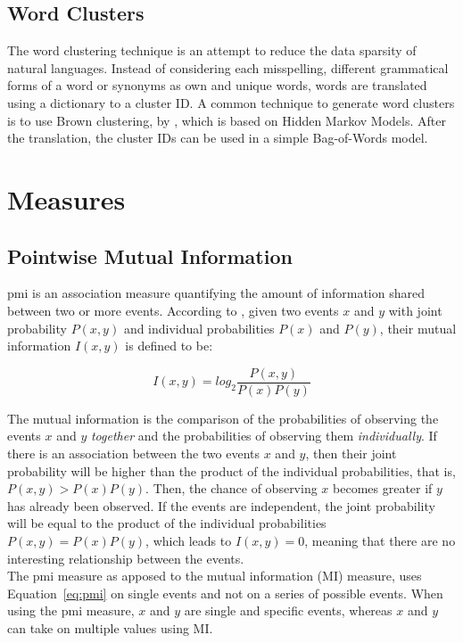 \subsection*{Word Clusters}
\label{sec:background_cluster}
The word clustering technique is an attempt to reduce the data sparsity of natural languages. Instead of considering each misspelling, different grammatical forms of a word or synonyms as own and unique words, words are translated using a dictionary to a cluster ID. A common technique to generate word clusters is to use Brown clustering, by \cite{Brown92}, which is based on Hidden Markov Models. After the translation, the cluster IDs can be used in a simple Bag-of-Words model.

\section{Measures}

\subsection{Pointwise Mutual Information}
\label{sec:pointwise_mutual_information}
\ac{pmi} is an association measure quantifying the amount of information shared between two or more events. According to \cite{fano1961transmission}, given two events $x$ and $y$ with joint probability $P(x, y)$ and individual probabilities $P(x)$ and $P(y)$, their mutual information $I(x, y)$ is defined to be:

\begin{equation}
\label{eq:pmi}
    I(x, y) = log_2 \frac{P(x, y)}{P(x)P(y)}
\end{equation}

The mutual information is the comparison of the probabilities of observing the events $x$ and $y$ \textit{together} and the probabilities of observing them \textit{individually}. If there is an association between the two events $x$ and $y$, then their joint probability will be higher than the product of the individual probabilities, that is, $P(x, y) > P(x)P(y)$. Then, the chance of observing $x$ becomes greater if $y$ has already been observed. If the events are independent, the joint probability will be equal to the product of the individual probabilities $P(x, y) = P(x)P(y)$, which leads to $I(x, y) = 0$, meaning that there are no interesting relationship between the events. \\

The \ac{pmi} measure as apposed to the mutual information (MI) measure, uses Equation~\ref{eq:pmi} on single events and not on a series of possible events. When using the \ac{pmi} measure, $x$ and $y$ are single and specific events, whereas $x$ and $y$ can take on multiple values using MI.

